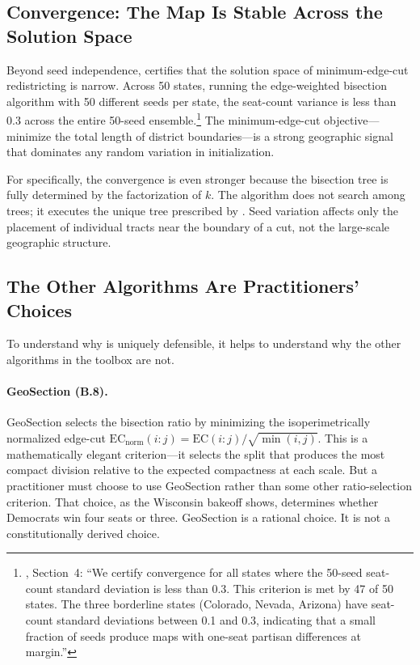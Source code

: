\subsection{Convergence: The Map Is Stable Across the Solution Space}

Beyond seed independence, \citet{b7paper} certifies that the solution space
of minimum-edge-cut redistricting is narrow.
Across 50 states, running the edge-weighted bisection algorithm with 50
different seeds per state, the seat-count variance is less than 0.3 across
the entire 50-seed ensemble.\footnote{%
  \citet{b7paper}, Section~4: ``We certify convergence for all states where
  the 50-seed seat-count standard deviation is less than 0.3.
  This criterion is met by 47 of 50 states.
  The three borderline states (Colorado, Nevada, Arizona) have seat-count
  standard deviations between 0.1 and 0.3, indicating that a small fraction
  of seeds produce maps with one-seat partisan differences at margin.''
}
The minimum-edge-cut objective---minimize the total length of district
boundaries---is a strong geographic signal that dominates any random
variation in initialization.

For \ar{} specifically, the convergence is even stronger because the
bisection tree is fully determined by the factorization of $k$.
The algorithm does not search among trees; it executes the unique tree
prescribed by \hh{}.
Seed variation affects only the placement of individual tracts near the
boundary of a cut, not the large-scale geographic structure.

\subsection{The Other Algorithms Are Practitioners' Choices}

To understand why \ar{} is uniquely defensible, it helps to understand
why the other algorithms in the toolbox are not.

\paragraph{GeoSection (B.8).}
GeoSection \citep{b8paper} selects the bisection ratio by minimizing the
isoperimetrically normalized edge-cut $\mathrm{EC}_\text{norm}(i:j) = \mathrm{EC}(i:j)/\sqrt{\min(i,j)}$.
This is a mathematically elegant criterion---it selects the split that
produces the most compact division relative to the expected compactness
at each scale.
But a practitioner must choose to use GeoSection rather than some other
ratio-selection criterion.
That choice, as the Wisconsin bakeoff shows, determines whether Democrats
win four seats or three.
GeoSection is a rational choice.
It is not a constitutionally derived choice.

